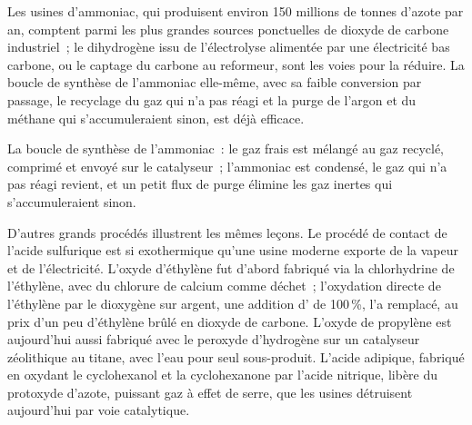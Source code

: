 Les usines d'ammoniac, qui produisent environ 150 millions de tonnes
d'azote par an, comptent parmi les plus grandes sources ponctuelles de
dioxyde de carbone industriel~; le dihydrogène issu de l'électrolyse
alimentée par une électricité bas carbone, ou le captage du carbone au
reformeur, sont les voies pour la réduire. La boucle de synthèse de
l'ammoniac elle-même, avec sa faible conversion par passage, le recyclage
du gaz qui n'a pas réagi et la purge de l'argon et du méthane qui
s'accumuleraient sinon, est déjà efficace.

\begin{omfigure}

{\small La boucle de synthèse de l'ammoniac~: le gaz frais est mélangé au
gaz recyclé, comprimé et envoyé sur le catalyseur~; l'ammoniac est
condensé, le gaz qui n'a pas réagi revient, et un petit flux de purge
élimine les gaz inertes qui s'accumuleraient sinon.}
\end{omfigure}

D'autres grands procédés illustrent les mêmes leçons. Le procédé de contact
de l'acide sulfurique est si exothermique qu'une usine moderne exporte de
la vapeur et de l'électricité. L'oxyde d'éthylène fut d'abord fabriqué via
la chlorhydrine de l'éthylène, avec du chlorure de calcium comme déchet~;
l'oxydation directe de l'éthylène par le dioxygène sur argent, une
addition d' de 100\,\%, l'a remplacé, au prix d'un peu
d'éthylène brûlé en dioxyde de carbone. L'oxyde de propylène est
aujourd'hui aussi fabriqué avec le peroxyde d'hydrogène sur un catalyseur
zéolithique au titane, avec l'eau pour seul sous-produit. L'acide adipique,
fabriqué en oxydant le cyclohexanol et la cyclohexanone par l'acide
nitrique, libère du protoxyde d'azote, puissant gaz à effet de serre, que
les usines détruisent aujourd'hui par voie catalytique.

